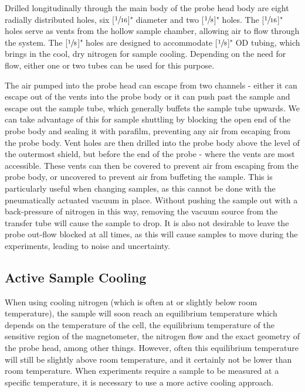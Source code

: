 \documentclass[PaulGanssle-Thesis.tex]{subfiles}
\begin{document}
Drilled longitudinally through the main body of the probe head body are eight radially distributed holes, six \unit[$\sfrac{1}{16}$]{"} diameter and two \unit[$\sfrac{1}{8}$]{"} holes. The \unit[$\sfrac{1}{16}$]{"} holes serve as vents from the hollow sample chamber, allowing air to flow through the system. The \unit[$\sfrac{1}{8}$]{"} holes are designed to accommodate \unit[$\sfrac{1}{8}$]{"} OD tubing, which brings in the cool, dry nitrogen for sample cooling. Depending on the need for flow, either one or two tubes can be used for this purpose.

The air pumped into the probe head can escape from two channels - either it can escape out of the vents into the probe body or it can push past the sample and escape out the sample tube, which generally buffets the sample tube upwards. We can take advantage of this for sample shuttling by blocking the open end of the probe body and sealing it with parafilm, preventing any air from escaping from the probe body. Vent holes are then drilled into the probe body above the level of the outermost shield, but before the end of the probe - where the vents are most accessible. These vents can then be covered to prevent air from escaping from the probe body, or uncovered to prevent air from buffeting the sample. This is particularly useful when changing samples, as this cannot be done with the pneumatically actuated vacuum in place. Without pushing the sample out with a back-pressure of nitrogen in this way, removing the vacuum source from the transfer tube will cause the sample to drop. It is also not desirable to leave the probe out-flow blocked at all times, as this will cause samples to move during the experiments, leading to noise and uncertainty.

\subsection{Active Sample Cooling}
\label{nmr.pneumatic.sample}
When using cooling nitrogen (which is often at or slightly below room temperature), the sample will soon reach an equilibrium temperature which depends on the temperature of the cell, the equilibrium temperature of the sensitive region of the magnetometer, the nitrogen flow and the exact geometry of the probe head, among other things. However, often this equilibrium temperature will still be slightly above room temperature, and it certainly not be lower than room temperature. When experiments require a sample to be measured at a specific temperature, it is necessary to use a more active cooling approach.
\end{document}
